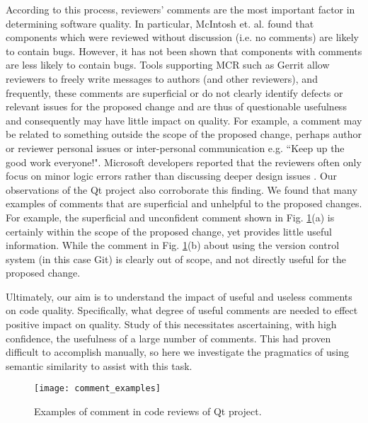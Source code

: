 According to this process, reviewers' comments are the most important factor in determining software quality.
In particular, McIntosh et. al. \cite{Mcintosh} found that components which were reviewed without discussion (i.e. no comments) are likely to contain bugs.
However, it has not been shown that components with comments are less likely to contain bugs. Tools supporting MCR such as Gerrit allow reviewers to freely write messages to authors (and other reviewers), and frequently, these comments are superficial or do not clearly identify defects or relevant issues for the proposed change and are thus of questionable usefulness and consequently may have little impact on quality.
For example, a comment may be related to something outside the scope of the proposed change, perhaps author or reviewer personal issues or inter-personal communication e.g. ``Keep up the good work everyone!".
Microsoft developers reported that the reviewers often only focus on minor logic errors rather than discussing deeper design issues \cite{Bacchelli2013a}.
Our observations of the Qt project also corroborate this finding.
We found that many examples of comments that are superficial and unhelpful to the proposed changes.
For example, the superficial and unconfident comment shown in Fig. \ref{fig:example}(a) is certainly within the scope of the proposed change, yet provides little useful information.
While the comment in Fig. \ref{fig:example}(b) about using the version control system (in this case Git) is clearly out of scope, and not directly useful for the proposed change. 

Ultimately, our aim is to understand the impact of useful and useless comments on code quality. Specifically, what degree of useful comments are needed to effect positive impact on quality. Study of this necessitates ascertaining, with high confidence, the usefulness of a large number of comments. This  had proven difficult to accomplish manually, so here we investigate the pragmatics of using semantic similarity to assist with this task.


\begin{figure}[!t]
\centering
\texttt{[image: comment\_examples]}
\caption{Examples of comment in code reviews of Qt project.}
\label{fig:example}
\end{figure}
